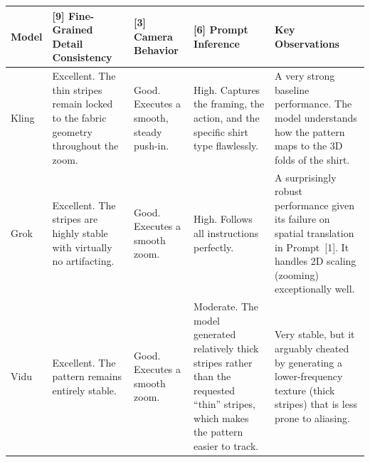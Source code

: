 \documentclass[sigconf]{acmart}
\begin{document}
\begin{table}[H]
    \centering
    \renewcommand{\arraystretch}{1.3}
    \begin{tabularx}{\textwidth}{| l | >{\raggedright\arraybackslash}X | >{\raggedright\arraybackslash}X | >{\raggedright\arraybackslash}X | >{\raggedright\arraybackslash}X |}
        \hline
        \textbf{Model} & \textbf{[9] Fine-Grained Detail Consistency}                                                                                                            & \textbf{[3] Camera Behavior}                                                                                 & \textbf{[6] Prompt Inference}                                                                                                               & \textbf{Key Observations}                                                                                                                     \\ \hline
        Kling          & Excellent. The thin stripes remain locked to the fabric geometry throughout the zoom.                                                                   & Good. Executes a smooth, steady push-in.                                                                     & High. Captures the framing, the action, and the specific shirt type flawlessly.                                                             & A very strong baseline performance. The model understands how the pattern maps to the 3D folds of the shirt.                                  \\ \hline
        Grok           & Excellent. The stripes are highly stable with virtually no artifacting.                                                                                 & Good. Executes a smooth zoom.                                                                                & High. Follows all instructions perfectly.                                                                                                   & A surprisingly robust performance given its failure on spatial translation in Prompt~[1]. It handles 2D scaling (zooming) exceptionally well. \\ \hline
        Vidu           & Excellent. The pattern remains entirely stable.                                                                                                         & Good. Executes a smooth zoom.                                                                                & Moderate. The model generated relatively thick stripes rather than the requested ``thin'' stripes, which makes the pattern easier to track. & Very stable, but it arguably cheated by generating a lower-frequency texture (thick stripes) that is less prone to aliasing.                  \\ \hline

\end{tabularx}
\end{table}
\end{document}
